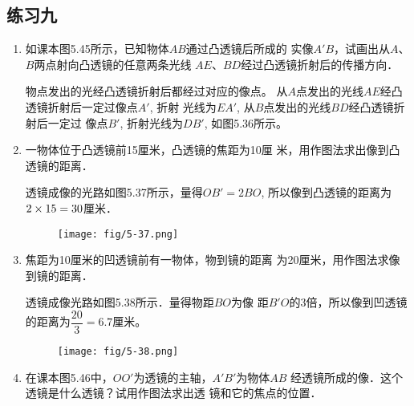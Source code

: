 \subsection{练习九}
\begin{enumerate}
    \item 如课本图5.45所示，已知物体$AB$通过凸透镜后所成的
    实像$A'B$，试画出从$A$、$B$两点射向凸透镜的任意两条光线
    $AE$、$BD$经过凸透镜折射后的传播方向．
    \begin{figure}[htp]\centering
{}
        \caption{}
        \end{figure}


    \begin{solution}
物点发出的光经凸透镜折射后都经过对应的像点。
从$A$点发出的光线$AE$经凸透镜折射后一定过像点$A'$, 折射
光线为$EA'$, 从$B$点发出的光线$BD$经凸透镜折射后一定过
像点$B'$, 折射光线为$DB'$, 如图5.36所示。
    \end{solution}
    \item 一物体位于凸透镜前15厘米，凸透镜的焦距为10厘
米，用作图法求出像到凸透镜的距离．

\begin{solution}
    透镜成像的光路如图5.37所示，量得$OB'=2BO$, 
    所以像到凸透镜的距离为$2\times15=30$厘米．
    \begin{figure}[htp]
        \centering
        \texttt{[image: fig/5-37.png]}
        \caption{}
    \end{figure}
\end{solution}
\item 焦距为10厘米的凹透镜前有一物体，物到镜的距离
为20厘米，用作图法求像到镜的距离．

\begin{solution}
    透镜成像光路如图5.38所示．量得物距$BO$为像
    距$B'O$的3倍，所以像到凹透镜的距离为$\dfrac{20}{3}=6.7$厘米。
    \begin{figure}[htp]
        \centering
        \texttt{[image: fig/5-38.png]}
        \caption{}
    \end{figure}
\end{solution}
\item 在课本图5.46中，$OO'$为透镜的主轴，$A'B'$为物体$AB$
经透镜所成的像．这个透镜是什么透镜？试用作图法求出透
镜和它的焦点的位置．                    


\end{enumerate}
